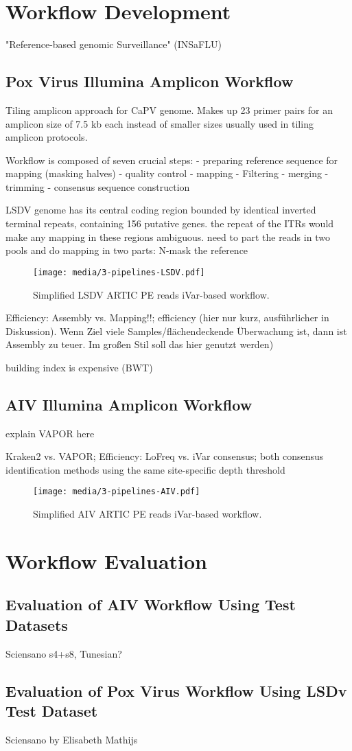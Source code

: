 \section{Workflow Development}
"Reference-based genomic Surveillance" (INSaFLU)

\subsection{Pox Virus Illumina Amplicon Workflow}

Tiling amplicon approach for CaPV genome. Makes up 23 primer pairs for an amplicon size of 7.5 kb each instead of smaller sizes usually used in tiling amplicon protocols.

Workflow is composed of seven crucial steps:
- preparing reference sequence for mapping (masking halves)
- quality control
- mapping
- Filtering
- merging
- trimming
- consensus sequence construction

LSDV genome has its central coding region bounded by identical inverted terminal repeats,
containing 156 putative genes. the repeat of the ITRs would make any mapping in these regions ambiguous.
need to part the reads in two pools and do mapping in two parts: N-mask the  reference 

\begin{figure}
	\centering
	\texttt{[image: media/3-pipelines-LSDV.pdf]}
	\caption{Simplified LSDV ARTIC PE reads iVar-based workflow.}
	\label{fig:3-pipelines-lsdv}
\end{figure}

Efficiency: Assembly vs. Mapping!!; efficiency (hier nur kurz, ausführlicher in Diskussion). Wenn Ziel viele Samples/flächendeckende Überwachung ist, dann ist Assembly zu teuer. Im großen Stil soll das hier genutzt werden)

building index is expensive (BWT)

\subsection{AIV Illumina Amplicon Workflow}

explain VAPOR here

Kraken2 vs. VAPOR;
Efficiency: LoFreq vs. iVar consensus; both consensus identification methods using the same site-specific depth threshold

\begin{figure}
	\centering
	\texttt{[image: media/3-pipelines-AIV.pdf]}
	\caption{Simplified AIV ARTIC PE reads iVar-based workflow.}
	\label{fig:3-pipelines-aiv}
\end{figure}

\section{Workflow Evaluation}
\subsection{Evaluation of AIV Workflow Using Test Datasets}
 Sciensano s4+s8, Tunesian?

\subsection{Evaluation of Pox Virus Workflow Using LSDv Test Dataset}
 Sciensano by Elisabeth Mathijs
